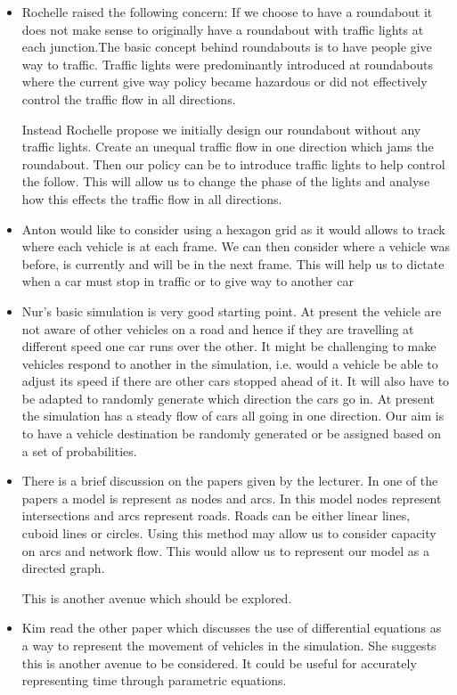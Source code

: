 \documentclass{article}
\begin{document}
	\begin{itemize}
		\item Rochelle raised the following concern:
		If we choose to have a roundabout it does not make sense to originally have a roundabout with traffic lights at each junction.The basic concept behind roundabouts is to have people give way to traffic. Traffic lights were predominantly introduced at roundabouts where the current give way policy became hazardous or did not effectively control the traffic flow in all directions.
		
		Instead Rochelle propose we initially design our roundabout without any traffic lights. Create an unequal traffic flow in one direction which jams the roundabout. Then our policy can be to introduce traffic lights to help control the follow. This will allow us to change the phase of the lights and analyse how this effects the traffic flow in all directions.  
		
		\item Anton would like to consider using a hexagon grid as it would allows to track where each vehicle is at each frame. We can then consider where a vehicle was before, is currently and will be in the next frame. This will help us to dictate when a car must stop in traffic or to give way to another car 
		
		\item Nur's basic simulation is very good starting point. At present the vehicle are not aware of other vehicles on a road and hence if they are travelling at different speed one car runs over the other.  It might be challenging to make vehicles respond to another in the simulation, i.e. would a vehicle be able to adjust its speed if there are other cars stopped ahead of it. It will also have to be adapted to randomly generate which direction the cars go in. At present the simulation has a steady flow of cars all going in one direction. Our aim is to have a vehicle destination be randomly generated or  be assigned based on a set of probabilities. 
		
		\item There is a brief discussion on the papers given by the lecturer. In one of the papers \cite{namekawa2005general} a model is represent as nodes and arcs. In this model nodes represent intersections and arcs represent roads. Roads can be either linear lines, cuboid lines or circles. Using this method may allow us to consider capacity on arcs and network flow. This would allow us to represent our model as a directed graph. 
		
		This is another avenue which should be explored. 
		
		\item Kim read the other paper \cite{sewall2010continuum} which discusses the use of differential equations as a way to represent the movement of vehicles in the simulation. She suggests this is another avenue to be considered. It could be useful for accurately representing time through parametric equations. \\\\
	\end{itemize}
	
\end{document}
